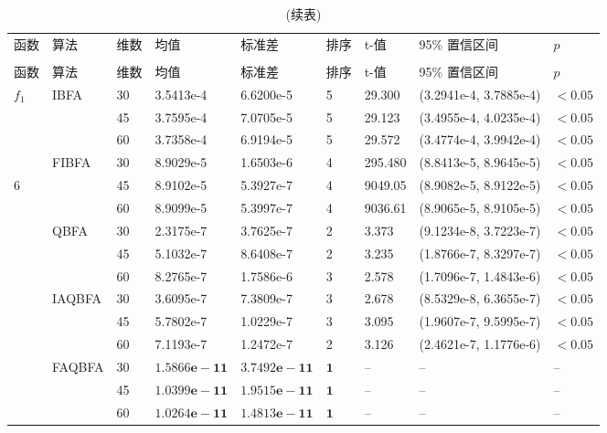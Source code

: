 \begin{longtable}[!tb]{p{0.3cm}p{1.2cm}p{0.3cm}p{2.45cm}p{2.45cm}p{0.5cm}p{1.2cm}p{4.5cm}p{1.5cm}}
\caption{$f_1-f_{7}$ 函数在不同维度下平均运行30次下均值和标准差\label{TableDifBFA}}
\vspace{0.5em}\\
        \hline
        函数  &  算法 & 维数	&   均值    &   标准差 & 排序&  t-值 &  95\% 置信区间 &  $p$   \\
        \hline
    \endfirsthead
        \caption{(续表)}\\
        \hline
         函数  &  算法 & 维数	&   均值    &   标准差 & 排序&  t-值 &  95\% 置信区间 &  $p$   \\
        \hline
    \endhead
        \hline
    \endfoot
        \hline
    \endlastfoot
$f_{1}$ &IBFA &30 &3.5413e-4 &6.6200e-5&5 &29.300 &(3.2941e-4, 3.7885e-4) & $<0.05$ \\
             & &45 &3.7595e-4 &7.0705e-5 &5 &29.123 &(3.4955e-4, 4.0235e-4) &$<0.05$  \\
             & &60 &3.7358e-4 &6.9194e-5 & 5&29.572 &(3.4774e-4, 3.9942e-4) &$<0.05$ \\
 &FIBFA &30 &8.9029e-5 &1.6503e-6& 4 &295.480 &(8.8413e-5, 8.9645e-5) &$<0.05$  \\6
             & &45 &8.9102e-5 &5.3927e-7 &4 &9049.05 &(8.9082e-5, 8.9122e-5) &$<0.05$  \\
             & &60 &8.9099e-5 &5.3997e-7 &4 &9036.61 &(8.9065e-5, 8.9105e-5) &$<0.05$  \\
 &QBFA &30 & 2.3175e-7 &3.7625e-7 &2  &3.373 &(9.1234e-8, 3.7223e-7) &$<0.05$\\
             & &45 &5.1032e-7  &8.6408e-7  &2  &3.235 &(1.8766e-7, 8.3297e-7) &$<0.05$\\
             & &60 &8.2765e-7 & 1.7586e-6 & 3 &2.578  &(1.7096e-7, 1.4843e-6) &$<0.05$\\
 &IAQBFA &30 &3.6095e-7 &7.3809e-7& 3&2.678 &(8.5329e-8, 6.3655e-7) &$<0.05$  \\
             & &45 &5.7802e-7 &1.0229e-7 &3&3.095 &(1.9607e-7, 9.5995e-7) &$<0.05$  \\
             & &60 &7.1193e-7 &1.2472e-7 & 2&3.126 &(2.4621e-7, 1.1776e-6) &$<0.05$  \\
 &FAQBFA &30 & $\bm{1.5866e-11}$ &$\bm{3.7492e-11}$ & $\bm{1}$&-- &-- &--  \\
             & &45 & $\bm{1.0399e-11}$ &$\bm{1.9515e-11}$  &$\bm{1}$ &-- &-- &--  \\
             & &60 & $\bm{1.0264e-11}$ & $\bm{1.4813e-11}$ & $\bm{1}$&-- &-- &--  \\

\end{longtable}
